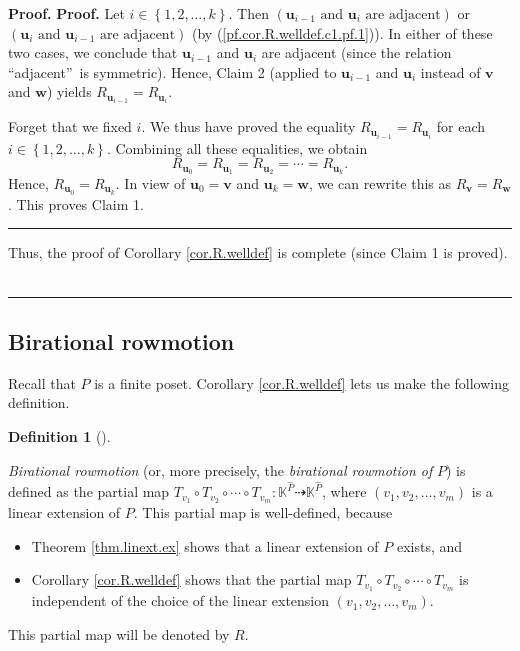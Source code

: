 \documentclass[numbers=enddot,12pt,final,onecolumn,notitlepage]{scrartcl}%
\theoremstyle{definition}
\newtheorem{defi}[theo]{Definition}
\newenvironment{definition}[1][]
{\begin{defi}[#1]\begin{leftbar}}
{\end{leftbar}\end{defi}}
\newenvironment{verlong}{}{}
\newenvironment{proof}[1][Proof]{\noindent\textbf{#1.} }{\ \rule{0.5em}{0.5em}}
\begin{document}
\begin{verlong}
\begin{proof}
\begin{proof}
Let $i\in\left\{  1,2,\ldots,k\right\}  $. Then $\left(  \mathbf{u}%
_{i-1}\text{ and }\mathbf{u}_{i}\text{ are adjacent}\right)  $ or $\left(
\mathbf{u}_{i}\text{ and }\mathbf{u}_{i-1}\text{ are adjacent}\right)  $ (by
(\ref{pf.cor.R.welldef.c1.pf.1})). In either of these two cases, we conclude
that $\mathbf{u}_{i-1}$ and $\mathbf{u}_{i}$ are adjacent (since the relation
\textquotedblleft adjacent\textquotedblright\ is symmetric). Hence, Claim 2
(applied to $\mathbf{u}_{i-1}$ and $\mathbf{u}_{i}$ instead of $\mathbf{v}$
and $\mathbf{w}$) yields $R_{\mathbf{u}_{i-1}}=R_{\mathbf{u}_{i}}$.

Forget that we fixed $i$. We thus have proved the equality $R_{\mathbf{u}%
_{i-1}}=R_{\mathbf{u}_{i}}$ for each $i\in\left\{  1,2,\ldots,k\right\}  $.
Combining all these equalities, we obtain%
\[
R_{\mathbf{u}_{0}}=R_{\mathbf{u}_{1}}=R_{\mathbf{u}_{2}}=\cdots=R_{\mathbf{u}%
_{k}}.
\]
Hence, $R_{\mathbf{u}_{0}}=R_{\mathbf{u}_{k}}$. In view of $\mathbf{u}%
_{0}=\mathbf{v}$ and $\mathbf{u}_{k}=\mathbf{w}$, we can rewrite this as
$R_{\mathbf{v}}=R_{\mathbf{w}}$. This proves Claim 1.
\end{proof}

Thus, the proof of Corollary \ref{cor.R.welldef} is complete (since Claim 1 is proved).
\end{proof}
\end{verlong}

\subsection{Birational rowmotion}

Recall that $P$ is a finite poset. Corollary \ref{cor.R.welldef} lets us make
the following definition.

\begin{definition}
\label{def.rm}\emph{Birational rowmotion} (or, more precisely, the
\emph{birational rowmotion of }$P$) is defined as the partial map $T_{v_{1}%
}\circ T_{v_{2}}\circ\cdots\circ T_{v_{m}}:\mathbb{K}^{\widehat{P}%
}\dashrightarrow\mathbb{K}^{\widehat{P}}$, where $\left(  v_{1},v_{2}%
,\ldots,v_{m}\right)  $ is a linear extension of $P$. This partial map is
well-defined, because

\begin{itemize}
\item Theorem \ref{thm.linext.ex} shows that a linear extension of $P$ exists, and

\item Corollary \ref{cor.R.welldef} shows that the partial map $T_{v_{1}}\circ
T_{v_{2}}\circ\cdots\circ T_{v_{m}}$ is independent of the choice of the
linear extension $\left(  v_{1},v_{2},\ldots,v_{m}\right)  $.
\end{itemize}

This partial map will be denoted by $R$.
\end{definition}
\end{document}
